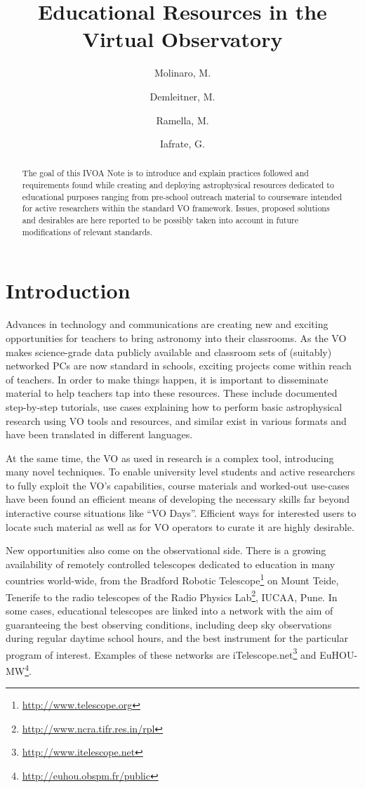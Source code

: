\documentclass{ivoa}
\author{Molinaro, M.}
\author{Demleitner, M.}
\author{Ramella, M.}
\author{Iafrate, G.}
\title{Educational Resources in the Virtual Observatory}
\begin{document}
\begin{abstract}

The goal of this IVOA Note is to introduce and explain practices followed
and requirements found while creating and 
deploying astrophysical resources 
dedicated to educational purposes ranging from pre-school outreach
material to courseware intended for active researchers
within the standard VO framework.
Issues, proposed solutions and desirables are here reported to be
possibly taken into account in future modifications of relevant
standards.



\end{abstract}


\section{Introduction}

Advances in technology and communications are creating new and exciting 
opportunities for teachers to bring astronomy into their 
classrooms.  As the VO makes science-grade data publicly available and
classroom sets of (suitably) networked PCs are now standard in schools,
exciting projects come within reach of teachers.  In order to make things 
happen, it is important to disseminate material to help teachers
tap into these resources.  These include documented step-by-step
tutorials, use cases explaining how to perform basic astrophysical research 
using VO tools and resources, and similar exist in various formats and
have been translated in different languages.

At the same time, the VO as used in research is a complex tool,
introducing many novel techniques.  To enable university level students
and active researchers to fully exploit the VO's capabilities, course
materials and worked-out use-cases have been found an efficient means of
developing the necessary skills far beyond interactive course situations
like ``VO Days''.  Efficient ways for interested users to locate such
material as well as for VO operators to curate it are highly desirable.

New opportunities also come on the observational side. 
There is a growing availability of remotely controlled 
telescopes dedicated to education in many countries world-wide, from the 
Bradford Robotic Telescope\footnote{\url{http://www.telescope.org}} on Mount
Teide, Tenerife 
to the radio telescopes of the Radio Physics
Lab\footnote{\url{http://www.ncra.tifr.res.in/rpl}}, IUCAA, Pune. 
In some cases, educational telescopes are 
linked into a network with the aim of guaranteeing the best observing conditions, 
including deep sky observations during regular daytime school hours, and 
the best instrument for the particular program of interest. Examples
of these networks are
iTelescope.net\footnote{\url{http://www.itelescope.net}} and
EuHOU-MW\footnote{\url{http://euhou.obspm.fr/public}}.
\end{document}
